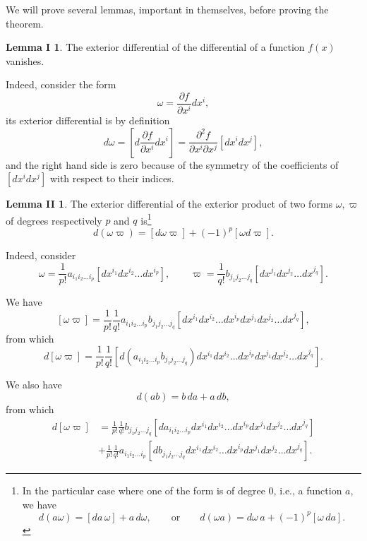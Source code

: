 \documentclass[leqno,11pt]{book}
\numberwithin{equation}{chapter}
\newcommand{\pd}{\partial}
\theoremstyle{shape1}
\theoremstyle{shape0}
\theoremstyle{shape2}
\theoremstyle{definition}
\begin{document}
We will prove several lemmas, important in themselves, before proving the theorem.

\newtheorem*{lem1*}{\hspace{15pt}Lemma I}

\begin{lem1*}
  The exterior differential of the differential of a function $f(x)$ vanishes.
\end{lem1*}
Indeed, consider the form
\[
\omega=\frac{\pd f}{\pd x^{i}}dx^{i},
\]
its exterior differential is by definition
\[
d\omega=\left[d\frac{\pd f}{\pd x^{i}}dx^{i}\right]=\frac{\pd^{2} f}{\pd x^{i}\pd x^{j}}[dx^{i}dx^{j}],
\]
and the right hand side is zero because of the symmetry of the coefficients of $[dx^{i}dx^{j}]$ with respect to their indices.

\newtheorem*{lem2*}{\hspace{15pt}Lemma II}
\begin{lem2*}
  The exterior differential of the exterior product of two forms $\omega,\varpi$ of degrees respectively $p$ and $q$ is\footnote{In the particular case where one of the form is of degree $0$, {i.e.}, a function $a$, we have
\[
d(a\omega)=[da\,\omega]+a\,d\omega,\qquad\text{or}\qquad d(\omega a)= d\omega\, a+(-1)^{p}[\omega\, da].
\]}
\begin{equation}
  \label{eq:2.3}
  d(\omega\varpi)=[d\omega\varpi]+(-1)^{p}[\omega d\varpi].
\end{equation}
\end{lem2*}

Indeed, consider
\[
\omega=\frac{1}{p!}a_{i_{1}i_{2}\dots i_{p}}[dx^{i_{1}}dx^{i_{2}}\dots dx^{i_{p}}],\qquad
\varpi=\frac{1}{q!}b_{j_{1}j_{2}\dots j_{q}}[dx^{j_{1}}dx^{j_{2}}\dots dx^{j_{q}}].
\]

We have
\[
[\omega\varpi]=\frac{1}{p!}\frac{1}{q!}a_{i_{1}i_{2}\dots i_{p}}b_{j_{1}j_{2}\dots j_{q}}[dx^{i_{1}}dx^{i_{2}}\dots dx^{i_{p}}dx^{j_{1}}dx^{j_{2}}\dots dx^{j_{q}}],
\]
from which
\[
d[\omega\varpi]=\frac{1}{p!}\frac{1}{q!}[d(a_{i_{1}i_{2}\dots i_{p}}b_{j_{1}j_{2}\dots j_{q}})dx^{i_{1}}dx^{i_{2}}\dots dx^{i_{p}}dx^{j_{1}}dx^{j_{2}}\dots dx^{j_{q}}].
\]

We also have
\[
d(ab)=b\,da+a\,db,
\]
from which
\begin{align*}
d[\omega\varpi]&=\frac{1}{p!}\frac{1}{q!}b_{j_{1}j_{2}\dots j_{q}}[da_{i_{1}i_{2}\dots i_{p}}dx^{i_{1}}dx^{i_{2}}\dots dx^{i_{p}}dx^{j_{1}}dx^{j_{2}}\dots dx^{j_{q}}]\\
&+\frac{1}{p!}\frac{1}{q!}a_{i_{1}i_{2}\dots i_{p}}[db_{j_{1}j_{2}\dots j_{q}}dx^{i_{1}}dx^{i_{2}}\dots dx^{i_{p}}dx^{j_{1}}dx^{j_{2}}\dots dx^{j_{q}}].
\end{align*}
\end{document}
